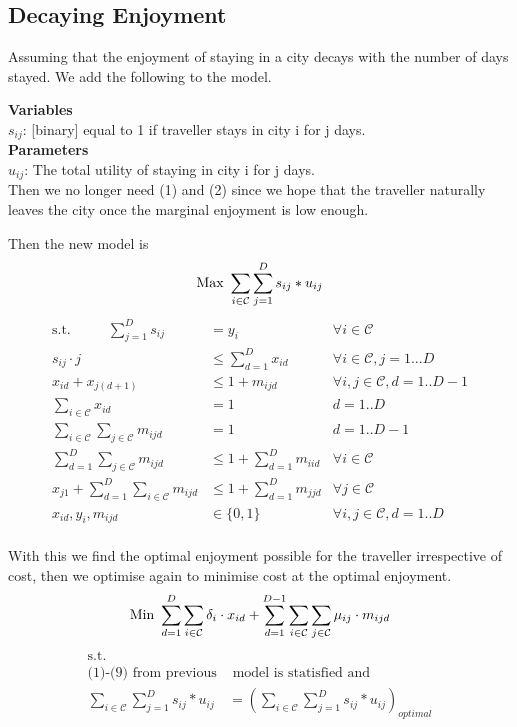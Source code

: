 \documentclass[12pt]{article}
\begin{document}
\newpage
\subsection{Decaying Enjoyment}
Assuming that the enjoyment of staying in a city decays with the number of days stayed. We add the following to the model.

\textbf{Variables}\\
$s_{ij}$: [binary] equal to 1 if traveller stays in city i for j days.\\

\textbf{Parameters} \\
$u_{ij}$: The total utility of staying in city i for j days.\\

Then we no longer need (1) and (2) since we hope that the traveller naturally leaves the city once the marginal enjoyment is low enough.

Then the new model is 
\begin{equation*}
\text{Max } \sum_{i \in \mathcal{C}} \sum_{j=1}^{D} s_{ij} * u_{ij}\\
\end{equation*}
\begin{align}
\text{s.t.~~~~~~~~}
\sum_{j=1}^{D} s_{ij} &= y_{i} & \forall i \in \mathcal{C}\\
s_{ij} \cdot j &\leq \sum_{d=1}^{D} x_{id} & \forall i \in \mathcal{C}, j=1...D\\
x_{id} + x_{j(d+1)} & \leq 1 + m_{ijd} & \forall i,j \in \mathcal{C}, d = 1..D-1 \\
\sum_{i \in \mathcal{C}} x_{id} &= 1 & d = 1..D \\
\sum_{i \in \mathcal{C}} \sum_{j \in \mathcal{C}} m_{ijd} &= 1 & d = 1..D-1 \\
\sum_{d=1}^{D} \sum_{j \in \mathcal{C}} m_{ijd} &\leq 1 + \sum_{d=1}^{D} m_{iid} & \forall i \in \mathcal{C} \\
x_{j1} + \sum_{d=1}^{D} \sum_{i \in \mathcal{C}} m_{ijd} &\leq 1 + \sum_{d=1}^{D} m_{jjd} & \forall j \in \mathcal{C}\\
x_{id}, y_{i}, m_{ijd} & \in \{0,1\} & \forall i, j \in \mathcal{C}, d = 1..D
\end{align}\\
With this we find the optimal enjoyment possible for the traveller irrespective of cost, then we optimise again to minimise cost at the optimal enjoyment.
\begin{equation*}
\text{Min } \sum_{d=1}^{D} \sum_{i \in \mathcal{C}} \delta_{i} \cdot x_{id} + \sum_{d=1}^{D-1} \sum_{i \in \mathcal{C}} \sum_{j \in \mathcal{C}} \mu_{ij} \cdot m_{ijd}\\
\end{equation*}
\begin{align*}
\text{s.t.~~~~~~~~} & \\
\text{(1)-(9) from previous} &\text{ model is statisfied and} \\
\sum_{i \in \mathcal{C}} \sum_{j=1}^{D} s_{ij} * u_{ij} &= (\sum_{i \in \mathcal{C}} \sum_{j=1}^{D} s_{ij} * u_{ij})_{optimal}
\end{align*}\\
\end{document}

